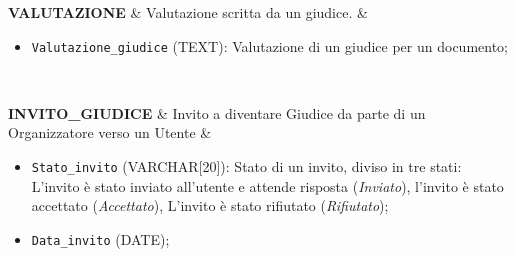 \documentclass[a4paper, 10pt]{article}
\begin{document}
{\begin{longtable}
			\textbf{VALUTAZIONE} &
			Valutazione scritta da un giudice. &
			\begin{itemize}
				\item \texttt{Valutazione\_giudice} (TEXT): Valutazione di un giudice per un documento;
			\end{itemize} \\
			\hline
			
			\textbf{INVITO\_GIUDICE} &
			Invito a diventare Giudice da parte di un Organizzatore verso un Utente &
			\begin{itemize}
				\item \texttt{Stato\_invito} (VARCHAR[20]): Stato di un invito, diviso in tre stati: L'invito è stato inviato all'utente e attende risposta (\textit{Inviato}), l'invito è stato accettato (\textit{Accettato}), L'invito è stato rifiutato (\textit{Rifiutato});
				\item \texttt{Data\_invito} (DATE);
			\end{itemize} \\ 
		\end{longtable}
	}
\end{document}

